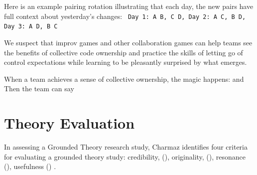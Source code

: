 Here is an example pairing rotation illustrating that each day, the new pairs have full context about yesterday's changes:
\texttt{
Day 1: A B, C D,
Day 2: A C, B D,
Day 3: A D, B C
}

We suspect that improv games and other collaboration games can help teams see the benefits of collective code ownership and practice the skills of letting go of control expectations while learning to be pleasantly surprised by what emerges.

When a team achieves a sense of collective ownership, the magic happens:  and  Then the team can say 
\section{Theory Evaluation}
\label{TheoryEvaluation}

In assessing a Grounded Theory research study, Charmaz identifies four criteria for evaluating a grounded theory study: credibility, (), originality, (), resonance (), usefulness () \cite{StolGTinSE}. 

